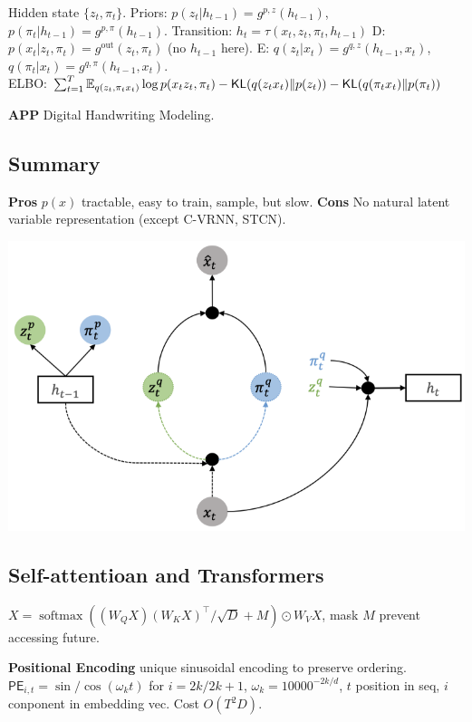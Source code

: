 Hidden state \(\{z_t, \pi_t\}\).
Priors: \(p(z_{t} | h_{t-1})=g^{p, z}(h_{t-1})\), \( p(\pi_{t} | h_{t-1})=g^{p, \pi}(h_{t-1})\).
Transition: \(h_{t}=\tau(x_{t}, z_{t}, \pi_{t}, h_{t-1})\)
\textsf{{D}}: \(p(x_{t} | z_{t}, \pi_{t})=g^{\text {out}}(z_{t}, \pi_{t})\) (no \(h_{t-1}\) here).
\textsf{{E}}: \(q(z_{t} | x_{t})=g^{q, z}(h_{t-1}, x_{t}) \), \( q(\pi_{t} | x_{t})=g^{q, \pi}(h_{t-1}, x_{t})\).\\
\textsf{{ELBO}}: \( \sum_{t=1}^{T} \mathbb{E}_{q(z_{t}, \pi_{t}  x_{t})} \log p(x_{t}  z_{t}, \pi_{t})- \operatorname{\mathsf{KL}} (q(z_{t}  x_{t}) \| p(z_{t})) - \operatorname{\mathsf{KL}}(q(\pi_{t}  x_{t}) \| p(\pi_{t}))\)

\textbf{APP} Digital Handwriting Modeling.

\subsection*{Summary}
\textbf{Pros} \(p(x)\) tractable, easy to train, sample, but slow.
\textbf{Cons} No natural latent variable representation (except C-VRNN, STCN).
\begin{center}
    \includegraphics[width=0.7\columnwidth]{figures/C-VRNN.png}
\end{center}

\subsection*{Self-attentioan and Transformers}

\(X=\operatorname{softmax}({({W}_{{Q}} {X})({W}_{{K}} {X})^{\top}}/{\sqrt{D}}+M) \odot {W}_{{V}} {X}\), mask \(M\) prevent accessing future. 

\textbf{Positional Encoding} unique sinusoidal encoding to preserve ordering. \(\mathsf{PE}_{i, t} =  \sin\text{/}\cos (\omega_{k} t)\) for \(i= 2k\text{/} 2k+1\), \(\omega_{k}=10000^{-{2 k}/{d}}\), \(t\) position in seq, \(i\) conponent in embedding vec.
Cost \(O(T^2 D)\).

